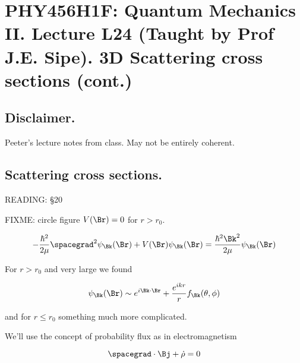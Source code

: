 
%

%
%
%

\chapter{PHY456H1F: Quantum Mechanics II.  Lecture L24 (Taught by Prof J.E. Sipe).  3D Scattering cross sections (cont.)}
\label{chap:qmTwoL24}
{}
\date{Dec 5, 2011}

\beginArtWithToc

\section{Disclaimer.}

Peeter's lecture notes from class.  May not be entirely coherent.

\section{Scattering cross sections.}

READING: \S 20 \cite{desai2009quantum}

FIXME: circle figure $V(\Br) = 0$ for $r > r_0$.

\begin{equation}\label{eqn:qmTwoL24:n}
-\frac{\hbar^2}{2\mu} \spacegrad^2
\psi_\Bk(\Br)
+ V(\Br)
\psi_\Bk(\Br)
=
\frac{\hbar^2 \Bk^2}{2 \mu}
\psi_\Bk(\Br)
\end{equation}

For $r > r_0$ and very large we found

\begin{equation}\label{eqn:qmTwoL24:n}
\psi_\Bk(\Br) \sim e^{i \Bk \cdot \Br} + \frac{e^{i k r}}{r} f_\Bk(\theta, \phi)
\end{equation}

and for $r \le r_0$ something much more complicated.

We'll use the concept of probability flux as in electromagnetism

\begin{equation}\label{eqn:qmTwoL24:n}
\spacegrad \cdot \Bj + \dot{\rho} = 0
\end{equation}

